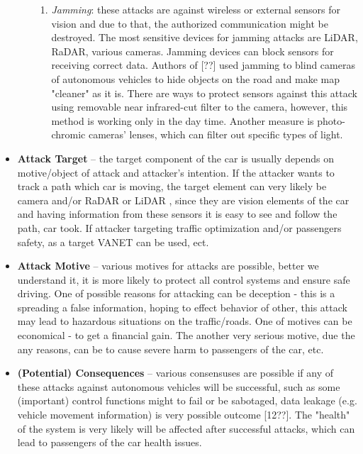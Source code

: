 \begin{itemize}
\begin{enumerate}
\begin{enumerate}
			\item \textit{Jamming}: these attacks are against wireless or external sensors for vision and due to that, the authorized communication might be destroyed. The most sensitive devices for jamming attacks are \gls{LiDAR}, \gls{RaDAR}, various cameras. Jamming devices can block sensors for receiving correct data. Authors of [??] used jamming to blind cameras of autonomous vehicles to hide objects on the road and make map "cleaner" as it is. There are ways to protect sensors against this attack using removable near infrared-cut filter to the camera, however, this method is working only in the day time. Another measure is photo-chromic cameras' lenses, which can filter out specific types of light.
		\end{enumerate}    
	\end{enumerate}
		
	\item \textbf{Attack Target} -- the target component of the car is usually depends on motive/object of attack and attacker’s intention. If the attacker wants to track a path which car is moving, the target element can very likely be camera and/or \gls{RaDAR} or \gls{LiDAR} , since they are vision elements of the car and having information from these sensors it is easy to see and follow the path, car took. If attacker targeting traffic optimization and/or passengers safety, as a target \gls{VANET} can be used, ect.
	\item \textbf{Attack Motive} -- various motives for attacks are possible, better we understand it, it is more likely to protect all control systems and ensure safe driving. One of possible reasons for attacking can be deception - this is a spreading a false information, hoping to effect behavior of other, this attack may lead to hazardous situations on the traffic/roads. One of motives can be economical - to get a financial gain. The another very serious motive, due the any reasons, can be to cause severe harm to passengers of the car, etc.
	\item \textbf{(Potential) Consequences} -- various consensuses are possible if any of these attacks against autonomous vehicles will be successful, such as some (important) control functions might to fail or be sabotaged, data leakage (e.g. vehicle movement information) is very possible outcome [12??]. The "health" of the system is very likely will be affected after successful attacks, which can lead to passengers of the car health issues.
\end{itemize}

